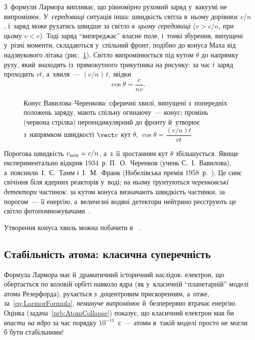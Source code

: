З~формули Лармора випливає, що рівномірно рухомий заряд у~вакуумі не випромінює. У~\emph{середовищі}
ситуація інша: швидкість світла в~ньому дорівнює $c/n$, і~заряд може рухатись швидше за світло
\emph{в~цьому середовищі} ($v>c/n$, при цьому $v<c$). Тоді заряд \enquote{випереджає} власне поле, і~тонкі збурення, випущені
у~різні моменти, складаються у~спільний фронт, подібно до конуса Маха від надзвукового
літака (рис.~\ref{pic:CherenkovCone}). Світло випромінюється під кутом $\theta$ до напрямку руху,
який знаходять із~прямокутного трикутника на рисунку: за час $t$ заряд проходить $vt$, а~хвиля~---
$(c/n)\,t$, звідки
$$\cos\theta=\frac{c}{nv}.$$
\begin{figure}[h!]\centering
	\caption{Конус Вавилова--Черенкова: сферичні хвилі, випущені з~попередніх положень заряду,
	мають спільну огинаючу~--- конус; промінь (червона стрілка) перпендикулярний до фронту
	й~утворює з~напрямком швидкості $\vect v$ кут $\theta$, $\cos\theta=\dfrac{(c/n)t}{vt}$\label{pic:CherenkovCone}}
\end{figure}
Порогова швидкість $v_{\rm min}=c/n$, а~з~її
зростанням кут $\theta$ збільшується. Явище експериментально відкрив 1934~р. П.~О.~Черенков
(учень С.~І.~Вавилова), а~пояснили~І.~Є.~Тамм і~І.~М.~Франк (Нобелівська премія 1958~р.~\cite{Nobel1958}).
Це синє свічіння біля ядерних реакторів у~воді; на ньому ґрунтуються \emph{черенковські
детектори} частинок: за кутом конуса визначають швидкість частинки, за порогом~--- її
енергію, а~величезні водяні детектори нейтрино реєструють це світло фотопомножувачами~\cite{Aguilar2010IceCube}.

\begin{Simulation}
Утворення конуса хвиль можна побачити в~
.
\end{Simulation}



\subsection*{Стабільність атома: класична суперечність}



Формула Лармора має й~драматичний історичний наслідок: електрон, що обертається по коловій
орбіті навколо ядра (як у~класичній \enquote{планетарній} моделі атома Резерфорда),
рухається з~доцентровим прискоренням, а~отже, за~\eqref{eq:LarmorFormula}, \emph{неминуче
випромінює} й~безперервно втрачає енергію. Оцінка (задача~\ref{prb:AtomCollapse}) показує,
що класичний електрон мав би \emph{впасти на ядро} за час порядку $10^{-11}$~с~--- атоми
в~такій моделі просто не могли б бути стабільними!

